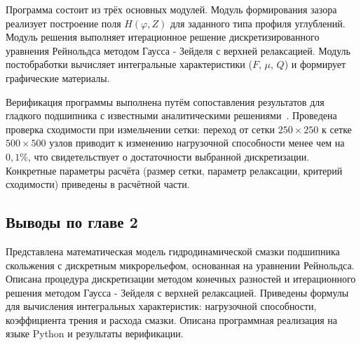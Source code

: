 Программа состоит из трёх основных модулей. Модуль формирования зазора реализует построение поля $H(\varphi, Z)$ для заданного типа профиля углублений. Модуль решения выполняет итерационное решение дискретизированного уравнения Рейнольдса методом Гаусса - Зейделя с верхней релаксацией. Модуль постобработки вычисляет интегральные характеристики ($F$, $\mu$, $Q$) и формирует графические материалы.

Верификация программы выполнена путём сопоставления результатов для гладкого подшипника с известными аналитическими решениями~\cite{pinkus}. Проведена проверка сходимости при измельчении сетки: переход от сетки $250 \times 250$ к сетке $500 \times 500$ узлов приводит к изменению нагрузочной способности менее чем на $0{,}1$\%, что свидетельствует о достаточности выбранной дискретизации. Конкретные параметры расчёта (размер сетки, параметр релаксации, критерий сходимости) приведены в расчётной части.

\subsection*{Выводы по главе 2}
{}

Представлена математическая модель гидродинамической смазки подшипника скольжения с дискретным микрорельефом, основанная на уравнении Рейнольдса. Описана процедура дискретизации методом конечных разностей и итерационного решения методом Гаусса - Зейделя с верхней релаксацией. Приведены формулы для вычисления интегральных характеристик: нагрузочной способности, коэффициента трения и расхода смазки. Описана программная реализация на языке Python и результаты верификации.
